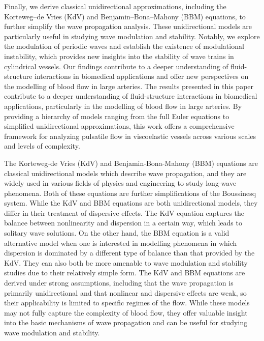 \documentclass[alpha-refs, 12pt]{wiley-article}
\begin{document}
Finally, we derive classical unidirectional approximations, including the Korteweg--de Vries (KdV) and Benjamin--Bona--Mahony (BBM) equations, to further simplify the wave propagation analysis. These unidirectional models are particularly useful in studying wave modulation and stability. Notably, we explore the modulation of periodic waves and establish the existence of modulational instability, which provides new insights into the stability of wave trains in cylindrical vessels. Our findings contribute to a deeper understanding of fluid-structure interactions in biomedical applications and offer new perspectives on the modelling of blood flow in large arteries. The results presented in this paper contribute to a deeper understanding of fluid-structure interactions in biomedical applications, particularly in the modelling of blood flow in large arteries. By providing a hierarchy of models ranging from the full Euler equations to simplified unidirectional approximations, this work offers a comprehensive framework for analyzing pulsatile flow in viscoelastic vessels across various scales and levels of complexity.

The Korteweg-de Vries (KdV) and Benjamin-Bona-Mahony (BBM) equations are classical unidirectional models which describe wave propagation, and they are widely used in various fields of physics and engineering to study long-wave phenomena. Both of these equations are further simplifications of the Boussinesq system. While the KdV and BBM equations are both unidirectional models, they differ in their treatment of dispersive effects. The KdV equation captures the balance between nonlinearity and dispersion in a certain way, which leads to solitary wave solutions. On the other hand, the BBM equation is a valid alternative model when one is interested in modelling phenomena in which dispersion is dominated by a different type of balance than that provided by the KdV. They can also both be more amenable to wave modulation and stability studies due to their relatively simple form. The KdV and BBM equations are derived under strong assumptions, including that the wave propagation is primarily unidirectional and that nonlinear and dispersive effects are weak, so their applicability is limited to specific regimes of the flow. While these models may not fully capture the complexity of blood flow, they offer valuable insight into the basic mechanisms of wave propagation and can be useful for studying wave modulation and stability.
\end{document}
